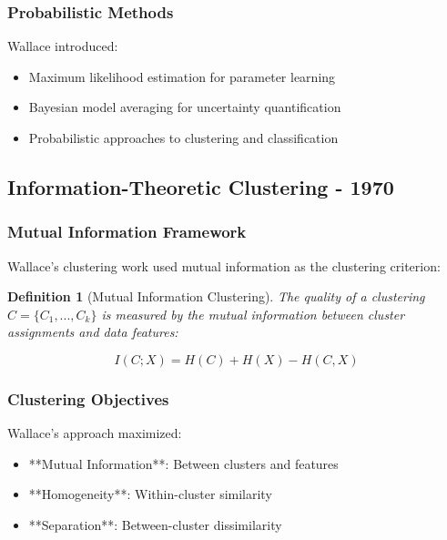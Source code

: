 \documentclass[12pt]{article}
\newtheorem{definition}{Definition}
\begin{document}
\subsubsection{Probabilistic Methods}

Wallace introduced:
\begin{itemize}
    \item Maximum likelihood estimation for parameter learning
    \item Bayesian model averaging for uncertainty quantification
    \item Probabilistic approaches to clustering and classification
\end{itemize}

\subsection{Information-Theoretic Clustering - 1970}

\subsubsection{Mutual Information Framework}

Wallace's clustering work \cite{wallace_clustering_1970} used mutual information as the clustering criterion:

\begin{definition}[Mutual Information Clustering]
The quality of a clustering $C = \{C_1, ..., C_k\}$ is measured by the mutual information between cluster assignments and data features:

\begin{equation}
I(C; X) = H(C) + H(X) - H(C,X)
\end{equation}
\end{definition}

\subsubsection{Clustering Objectives}

Wallace's approach maximized:
\begin{itemize}
    \item **Mutual Information**: Between clusters and features
    \item **Homogeneity**: Within-cluster similarity
    \item **Separation**: Between-cluster dissimilarity
\end{itemize}
\end{document}
